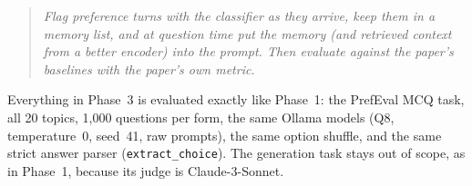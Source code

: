 \documentclass[11pt,a4paper]{article}
\begin{document}
\begin{quote}\itshape
Flag preference turns with the classifier as they arrive, keep them in a memory list, and at question time put the memory (and retrieved context
from a better encoder) into the prompt. Then evaluate against the paper's baselines with the paper's own metric.
\end{quote}

Everything in Phase~3 is evaluated exactly like Phase~1: the PrefEval MCQ task, all 20 topics, 1{,}000 questions per form, the same Ollama models
(Q8, temperature~0, seed~41, raw prompts), the same option shuffle, and the same strict answer parser (\texttt{extract\_choice}).
The generation task stays out of scope, as in Phase~1, because its judge is Claude-3-Sonnet.

\end{document}
